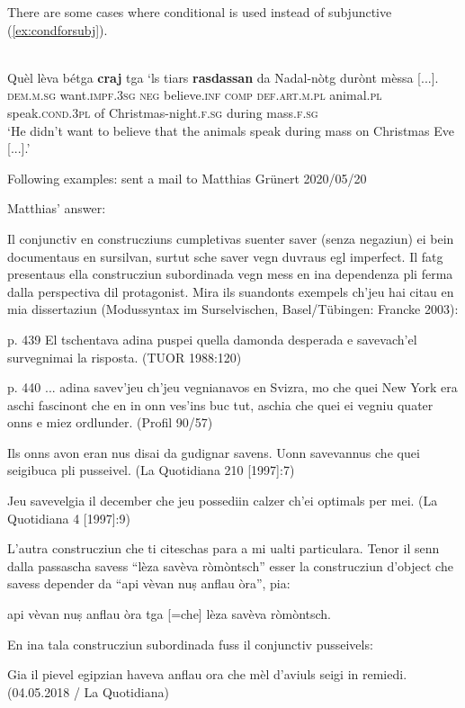 There are some cases where conditional is used instead of subjunctive (\ref{ex:condforsubj}).


\ea
\label{ex:condforsubj}
 {\citealt[132]{Büchli1966}}\\
\gll Quèl lèva bétga \textbf{craj} tga `ls tiars \textbf{rasdassan} da Nadal-nòtg durònt mèssa [...].\\
\textsc{dem.m.sg} want.\textsc{impf.3sg} \textsc{neg} believe.\textsc{inf} \textsc{comp} \textsc{def.art.m.pl} animal.\textsc{pl} speak.\textsc{cond.3pl} of Christmas-night.\textsc{f.sg} during mass.\textsc{f.sg}\\
\glt `He didn't want to believe that the animals speak during mass on Christmas Eve [...].'
\z

Following examples: sent a mail to Matthias Grünert 2020/05/20

Matthias' answer:

Il conjunctiv en construcziuns cumpletivas suenter saver (senza negaziun) ei bein documentaus en sursilvan, surtut sche saver vegn duvraus egl imperfect. Il fatg presentaus ella construcziun subordinada vegn mess en ina dependenza pli ferma dalla perspectiva dil protagonist. Mira ils suandonts exempels ch’jeu hai citau en mia dissertaziun (Modussyntax im Surselvischen, Basel/Tübingen: Francke 2003):

p. 439
El tschentava adina puspei quella damonda desperada e savevach’el survegnimai la risposta. (TUOR 1988:120)

p. 440
... adina savev’jeu ch’jeu vegnianavos en Svizra, mo che quei New York era aschi fascinont che en in onn ves’ins buc tut, aschia che quei ei vegniu quater onns e miez ordlunder. (Profil 90/57)

Ils onns avon eran nus disai da gudignar savens. Uonn savevannus che quei seigibuca pli pusseivel. (La Quotidiana 210 [1997]:7)

Jeu savevelgia il december che jeu possediin calzer ch’ei optimals per mei. (La Quotidiana 4 [1997]:9)

L’autra construcziun che ti citeschas para a mi ualti particulara. Tenor il senn dalla passascha savess “lèza savèva ròmòntsch” esser la construcziun d’object che savess depender da “api vèvan nuṣ anflau òra”, pia:

api vèvan nuṣ anflau òra tga [=che] lèza savèva ròmòntsch.

En ina tala construcziun subordinada fuss il conjunctiv pusseivels:

Gia il pievel egipzian haveva anflau ora che mèl d’aviuls seigi in remiedi. (04.05.2018 / La Quotidiana)

